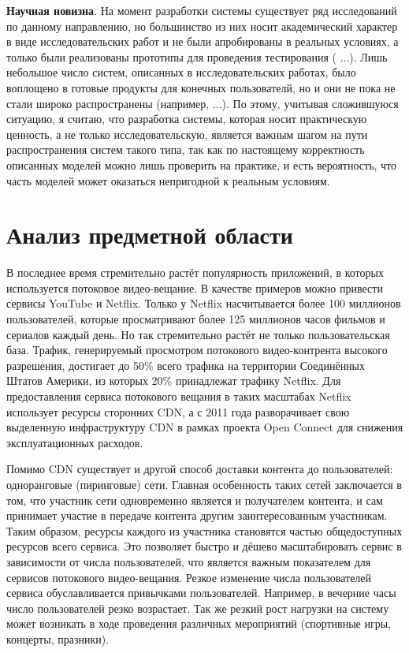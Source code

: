 	\textbf{Научная новизна}. На момент разработки системы существует ряд исследований по данному направлению, но
	большинство из них носит академический характер в виде исследовательских работ и не были апробированы в реальных
	условиях, а только были реализованы прототипы для проведения тестирования ({\color{red} ...}). Лишь небольшое число
	систем, описанных в исследовательских работах, было воплощено в готовые продукты для конечных пользователй, но и они
	не пока не стали широко распространены (например, {\color{red} ...}). По этому, учитывая сложившуюся ситуацию, я
	считаю, что разработка системы, которая носит практическую ценность, а не только исследовательскую, является важным
	шагом на пути распространения систем такого типа, так как по настоящему корректность описанных моделей можно лишь
	проверить на практике, и есть вероятность, что часть моделей может оказаться непригодной к реальным условиям.

\section{Анализ предметной области}

	В последнее время стремительно растёт популярность приложений, в которых используется потоковое видео-вещание.
	В качестве примеров можно привести сервисы YouTube и Netflix. Только у Netflix насчитывается более 100 миллионов
	пользователей, которые просматривают более 125 миллионов часов фильмов и сериалов каждый день. Но так стремительно
	растёт не только пользовательская база. Трафик, генерируемый просмотром потокового видео-контрента высокого
	разрешения, достигает до 50\% всего трафика на территории Соединённых Штатов Америки, из которых 20\% принадлежат
	трафику Netflix. Для предоставления сервиса потокового вещания в таких масштабах Netflix использует ресурсы
	сторонних CDN, а с 2011 года разворачивает свою выделенную инфраструктуру CDN в рамках проекта Open Connect для
	снижения эксплуатационных расходов.

	Помимо CDN существует и другой способ доставки контента до пользователей: одноранговые (пиринговые) сети.
	Главная особенность таких сетей заключается в том, что участник сети одновременно является и получателем контента,
	и сам принимает участие в передаче контента другим заинтересованным участникам. Таким образом, ресурсы каждого из
	участника становятся частью общедоступных ресурсов всего сервиса. Это позволяет быстро и дёшево масштабировать
	сервис в зависимости от числа пользователей, что является важным показателем для сервисов потокового видео-вещания.
	Резкое изменение числа пользователей сервиса обуславливается привычками пользователей. Например, в вечерние часы
	число пользователей резко возрастает. Так же резкий рост нагрузки на систему может возникать в ходе проведения
	различных мероприятий (спортивные игры, концерты, празники).

